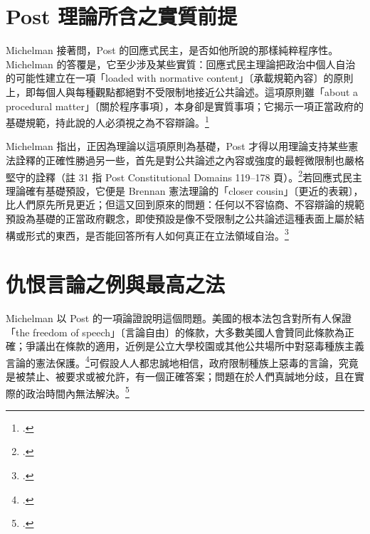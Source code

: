 \section{Post 理論所含之實質前提}
\label{sec:20_responsive-5}

Michelman 接著問，Post 的回應式民主，是否如他所說的那樣純粹程序性。Michelman 的答覆是，它至少涉及某些實質：回應式民主理論把政治中個人自治的可能性建立在一項「loaded with normative content」〔承載規範內容〕的原則上，即每個人與每種觀點都絕對不受限制地接近公共論述。這項原則雖「about a procedural matter」〔關於程序事項〕，本身卻是實質事項；它揭示一項正當政府的基礎規範，持此說的人必須視之為不容辯論。\footcite[407]{michelman1998}

Michelman 指出，正因為理論以這項原則為基礎，Post 才得以用理論支持某些憲法詮釋的正確性勝過另一些，首先是對公共論述之內容或強度的最輕微限制也嚴格堅守的詮釋（註 31 指 Post Constitutional Domains 119--178 頁）。\footcite[407 n.31]{michelman1998}若回應式民主理論確有基礎預設，它便是 Brennan 憲法理論的「closer cousin」〔更近的表親〕，比人們原先所見更近；但這又回到原來的問題：任何以不容協商、不容辯論的規範預設為基礎的正當政府觀念，即使預設是像不受限制之公共論述這種表面上屬於結構或形式的東西，是否能回答所有人如何真正在立法領域自治。\footcite[407]{michelman1998}

\section{仇恨言論之例與最高之法}
\label{sec:20_responsive-6}

Michelman 以 Post 的一項論證說明這個問題。美國的根本法包含對所有人保證「the freedom of speech」〔言論自由〕的條款，大多數美國人會贊同此條款為正確；爭議出在條款的適用，近例是公立大學校園或其他公共場所中對惡毒種族主義言論的憲法保護。\footcite[407 n.32]{michelman1998}可假設人人都忠誠地相信，政府限制種族上惡毒的言論，究竟是被禁止、被要求或被允許，有一個正確答案；問題在於人們真誠地分歧，且在實際的政治時間內無法解決。\footcite[407--408]{michelman1998}

